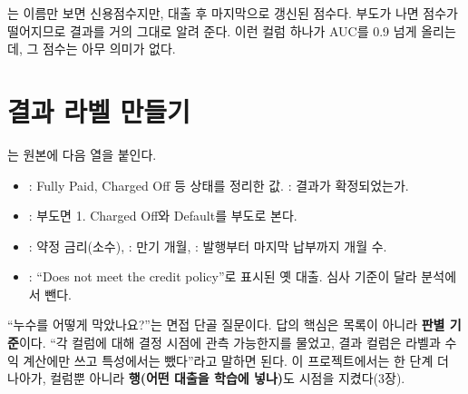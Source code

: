 \begin{warnbox}[미묘한 누수]
는 이름만 보면 신용점수지만, 대출 후 마지막으로 갱신된 점수다. 부도가 나면 점수가 떨어지므로 결과를 거의 그대로 알려 준다. 이런 컬럼 하나가 AUC를 0.9 넘게 올리는데, 그 점수는 아무 의미가 없다.
\end{warnbox}

\section{결과 라벨 만들기}
는 원본에 다음 열을 붙인다.
\begin{itemize}[leftmargin=*]
\item {}: Fully Paid, Charged Off 등 상태를 정리한 값. : 결과가 확정되었는가.
\item {}: 부도면 1. Charged Off와 Default를 부도로 본다.
\item {}: 약정 금리(소수), : 만기 개월, : 발행부터 마지막 납부까지 개월 수.
\item {}: ``Does not meet the credit policy''로 표시된 옛 대출. 심사 기준이 달라 분석에서 뺀다.
\end{itemize}

\begin{career}
``누수를 어떻게 막았나요?''는 면접 단골 질문이다. 답의 핵심은 목록이 아니라 \textbf{판별 기준}이다. ``각 컬럼에 대해 결정 시점에 관측 가능한지를 물었고, 결과 컬럼은 라벨과 수익 계산에만 쓰고 특성에서는 뺐다''라고 말하면 된다. 이 프로젝트에서는 한 단계 더 나아가, 컬럼뿐 아니라 \textbf{행(어떤 대출을 학습에 넣나)}도 시점을 지켰다(3장).
\end{career}
